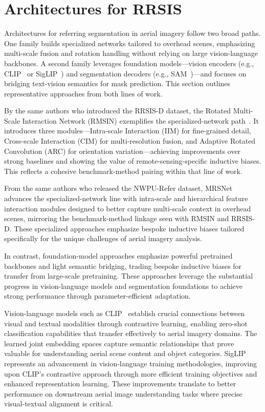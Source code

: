\section{Architectures for RRSIS}

Architectures for referring segmentation in aerial imagery follow two broad paths. One family builds specialized networks tailored to overhead scenes, emphasizing multi-scale fusion and rotation handling without relying on large vision-language backbones. A second family leverages foundation models—vision encoders (e.g., CLIP~\cite{clip} or SigLIP~\cite{siglip,siglip2}) and segmentation decoders (e.g., SAM~\cite{sam})—and focuses on bridging text-vision semantics for mask prediction. This section outlines representative approaches from both lines of work.

By the same authors who introduced the RRSIS-D dataset, the Rotated Multi-Scale Interaction Network (RMSIN) exemplifies the specialized-network path~\cite{liu2024rotated}. It introduces three modules—Intra-scale Interaction (IIM) for fine-grained detail, Cross-scale Interaction (CIM) for multi-resolution fusion, and Adaptive Rotated Convolution (ARC) for orientation variation—achieving improvements over strong baselines and showing the value of remote-sensing-specific inductive biases. This reflects a cohesive benchmark-method pairing within that line of work.

From the same authors who released the NWPU-Refer dataset, MRSNet advances the specialized-network line with intra-scale and hierarchical feature interaction modules designed to better capture multi-scale context in overhead scenes, mirroring the benchmark-method linkage seen with RMSIN and RRSIS-D. These specialized approaches emphasize bespoke inductive biases tailored specifically for the unique challenges of aerial imagery analysis.

In contrast, foundation-model approaches emphasize powerful pretrained backbones and light semantic bridging, trading bespoke inductive biases for transfer from large-scale pretraining. These approaches leverage the substantial progress in vision-language models and segmentation foundations to achieve strong performance through parameter-efficient adaptation.

Vision-language models such as CLIP~\cite{clip} establish crucial connections between visual and textual modalities through contrastive learning, enabling zero-shot classification capabilities that transfer effectively to aerial imagery domains. The learned joint embedding spaces capture semantic relationships that prove valuable for understanding aerial scene content and object categories. SigLIP~\cite{siglip,siglip2} represents an advancement in vision-language training methodologies, improving upon CLIP's contrastive approach through more efficient training objectives and enhanced representation learning. These improvements translate to better performance on downstream aerial image understanding tasks where precise visual-textual alignment is critical.

